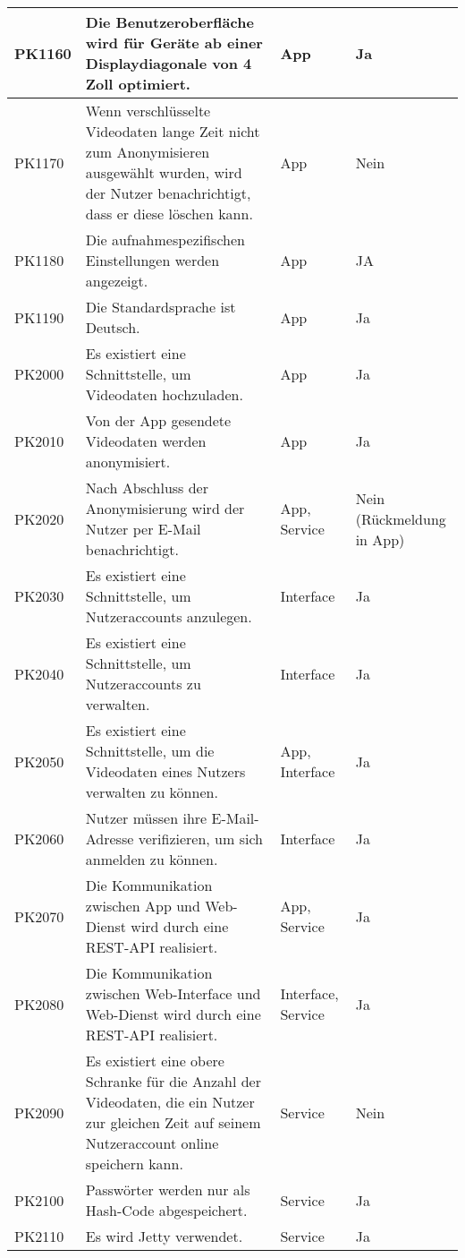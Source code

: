 \begin{longtable}{p{} | p{} | p{} | p{}}
   \\
  \hline 
  PK1160 & Die Benutzeroberfläche wird für Geräte ab einer Displaydiagonale von 4 Zoll optimiert. & App & Ja
   \\
  \hline 
  PK1170 & Wenn verschlüsselte Videodaten lange Zeit nicht zum Anonymisieren ausgewählt wurden, wird der Nutzer benachrichtigt, dass er diese löschen kann. & App & Nein
   \\
  \hline 
  PK1180 & Die aufnahmespezifischen Einstellungen werden angezeigt. & App & JA
   \\
  \hline 
  PK1190 & Die Standardsprache ist Deutsch. & App & Ja
   \\
  \hline 
  PK2000 & Es existiert eine Schnittstelle, um Videodaten hochzuladen. & App & Ja
   \\
  \hline 
  PK2010 & Von der App gesendete Videodaten werden anonymisiert. & App & Ja
   \\
  \hline 
  PK2020 & Nach Abschluss der Anonymisierung wird der Nutzer per E-Mail benachrichtigt. & App, Service & Nein (Rückmeldung in App)
   \\
  \hline 
  PK2030 & Es existiert eine Schnittstelle, um Nutzeraccounts anzulegen. & Interface & Ja
   \\
  \hline 
  PK2040 & Es existiert eine Schnittstelle, um Nutzeraccounts zu verwalten. & Interface & Ja
   \\
  \hline 
  PK2050 & Es existiert eine Schnittstelle, um die Videodaten eines Nutzers verwalten
zu können. & App, Interface & Ja
   \\
  \hline 
  PK2060 & Nutzer müssen ihre E-Mail-Adresse verifizieren, um sich anmelden zu können. & Interface & Ja
   \\
  \hline 
  PK2070 & Die Kommunikation zwischen App und Web-Dienst wird durch eine REST-API realisiert. & App, Service & Ja
   \\
  \hline 
  PK2080 & Die Kommunikation zwischen Web-Interface und Web-Dienst wird durch eine REST-API realisiert. & Interface, Service & Ja
   \\
  \hline 
  PK2090 & Es existiert eine obere Schranke für die Anzahl der Videodaten, die ein Nutzer zur gleichen Zeit auf seinem Nutzeraccount online speichern kann. & Service & Nein
   \\
  \hline 
  PK2100 & Passwörter werden nur als Hash-Code abgespeichert. & Service & Ja
   \\
  \hline 
  PK2110 & Es wird Jetty verwendet. & Service & Ja
   \\
  \hline 

\end{longtable}
